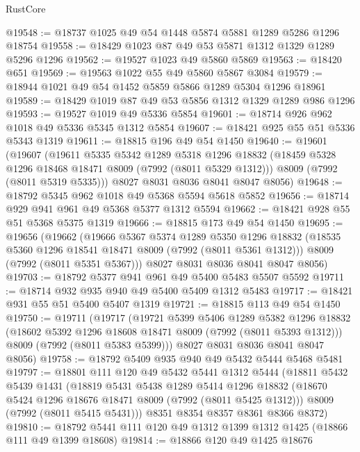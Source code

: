 \begin{lexlean}{RustCore}
\begin{coremodule}
@19548 := @18737 @1025 @49 @54 @1448 @5874 @5881 @1289 @5286 @1296 @18754
@19558 := @18429 @1023 @87 @49 @53 @5871 @1312 @1329 @1289 @5296 @1296
@19562 := @19527 @1023 @49 @5860 @5869
@19563 := @18420 @651
@19569 := @19563 @1022 @55 @49 @5860 @5867 @3084
@19579 := @18944 @1021 @49 @54 @1452 @5859 @5866 @1289 @5304 @1296 @18961
@19589 := @18429 @1019 @87 @49 @53 @5856 @1312 @1329 @1289 @986 @1296
@19593 := @19527 @1019 @49 @5336 @5854
@19601 := @18714 @926 @962 @1018 @49 @5336 @5345 @1312 @5854
@19607 := @18421 @925 @55 @51 @5336 @5343 @1319
@19611 := @18815 @196 @49 @54 @1450
@19640 := @19601
    (@19607
      (@19611
        @5335
        @5342
        @1289
        @5318
        @1296
        @18832
        (@18459 @5328 @1296 @18468 @18471 @8009 (@7992 (@8011 @5329 @1312)))
        @8009
        (@7992 (@8011 @5319 @5335)))
      @8027
      @8031
      @8036
      @8041
      @8047
      @8056)
@19648 := @18792 @5345 @962 @1018 @49 @5368 @5594 @5618 @5852
@19656 := @18714 @929 @941 @961 @49 @5368 @5377 @1312 @5594
@19662 := @18421 @928 @55 @51 @5368 @5375 @1319
@19666 := @18815 @173 @49 @54 @1450
@19695 := @19656
    (@19662
      (@19666
        @5367
        @5374
        @1289
        @5350
        @1296
        @18832
        (@18535 @5360 @1296 @18541 @18471 @8009 (@7992 (@8011 @5361 @1312)))
        @8009
        (@7992 (@8011 @5351 @5367)))
      @8027
      @8031
      @8036
      @8041
      @8047
      @8056)
@19703 := @18792 @5377 @941 @961 @49 @5400 @5483 @5507 @5592
@19711 := @18714 @932 @935 @940 @49 @5400 @5409 @1312 @5483
@19717 := @18421 @931 @55 @51 @5400 @5407 @1319
@19721 := @18815 @113 @49 @54 @1450
@19750 := @19711
    (@19717
      (@19721
        @5399
        @5406
        @1289
        @5382
        @1296
        @18832
        (@18602 @5392 @1296 @18608 @18471 @8009 (@7992 (@8011 @5393 @1312)))
        @8009
        (@7992 (@8011 @5383 @5399)))
      @8027
      @8031
      @8036
      @8041
      @8047
      @8056)
@19758 := @18792 @5409 @935 @940 @49 @5432 @5444 @5468 @5481
@19797 := @18801
    @111
    @120
    @49
    @5432
    @5441
    @1312
    @5444
    (@18811
      @5432
      @5439
      @1431
      (@18819
        @5431
        @5438
        @1289
        @5414
        @1296
        @18832
        (@18670 @5424 @1296 @18676 @18471 @8009 (@7992 (@8011 @5425 @1312)))
        @8009
        (@7992 (@8011 @5415 @5431)))
      @8351
      @8354
      @8357
      @8361
      @8366
      @8372)
@19810 := @18792 @5441 @111 @120 @49 @1312 @1399 @1312 @1425 (@18866 @111 @49 @1399 @18608)
@19814 := @18866 @120 @49 @1425 @18676

\end{coremodule}
\end{lexlean}
